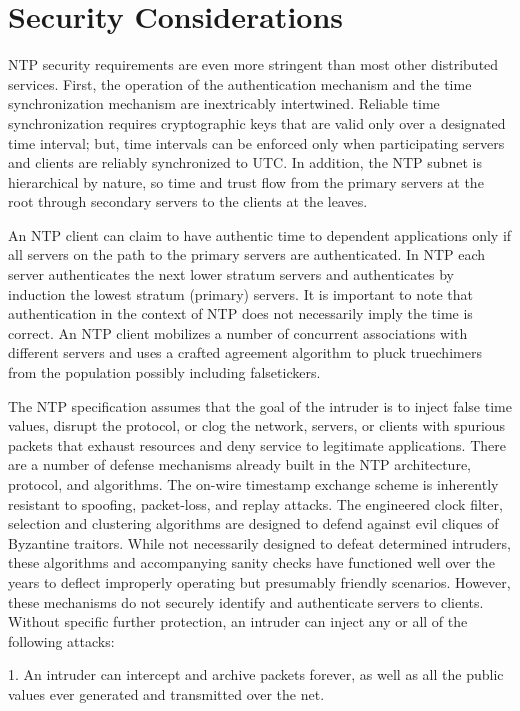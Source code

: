\chapter{Security Considerations}

NTP security requirements are even more stringent than most other
distributed services.  First, the operation of the authentication
mechanism and the time synchronization mechanism are inextricably
intertwined.  Reliable time synchronization requires cryptographic
keys that are valid only over a designated time interval; but, time
intervals can be enforced only when participating servers and clients
are reliably synchronized to UTC.  In addition, the NTP subnet is
hierarchical by nature, so time and trust flow from the primary
servers at the root through secondary servers to the clients at the
leaves.

An NTP client can claim to have authentic time to dependent
applications only if all servers on the path to the primary servers
are authenticated.  In NTP each server authenticates the next lower
stratum servers and authenticates by induction the lowest stratum
(primary) servers.  It is important to note that authentication in
the context of NTP does not necessarily imply the time is correct.
An NTP client mobilizes a number of concurrent associations with
different servers and uses a crafted agreement algorithm to pluck
truechimers from the population possibly including falsetickers.

The NTP specification assumes that the goal of the intruder is to
inject false time values, disrupt the protocol, or clog the network,
servers, or clients with spurious packets that exhaust resources and
deny service to legitimate applications.  There are a number of
defense mechanisms already built in the NTP architecture, protocol,
and algorithms.  The on-wire timestamp exchange scheme is inherently
resistant to spoofing, packet-loss, and replay attacks.  The
engineered clock filter, selection and clustering algorithms are
designed to defend against evil cliques of Byzantine traitors.  While
not necessarily designed to defeat determined intruders, these
algorithms and accompanying sanity checks have functioned well over
the years to deflect improperly operating but presumably friendly
scenarios.  However, these mechanisms do not securely identify and
authenticate servers to clients.  Without specific further
protection, an intruder can inject any or all of the following
attacks:

1.  An intruder can intercept and archive packets forever, as well as
all the public values ever generated and transmitted over the
net.

